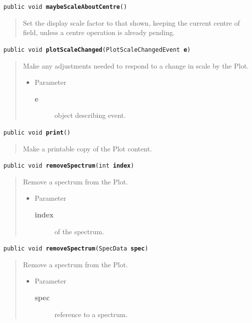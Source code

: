 \documentclass[twoside,11pt]{article}
\renewcommand{\_}{\texttt{\symbol{95}}}
\newcommand{\method}[1]{\texttt{#1}}
\newenvironment{desc}{\begin{quote}}{\end{quote}}
\begin{document}
\method{public void \textbf{maybeScaleAboutCentre}()\label{l186}\label{l187}}
\begin{desc}Set the display scale factor to that shown, keeping the current
 centre of field, unless a centre operation is already pending.
\end{desc}

\method{public void \textbf{plotScaleChanged}(\texttt{PlotScaleChangedEvent} \textbf{e})\label{l188}\label{l189}}
\begin{desc}Make any adjustments needed to respond to a change in scale by
 the Plot.
\begin{itemize}
\item{Parameter
  \begin{description}
   \item[\textbf{e}]{object describing event.}
  \end{description}}
\end{itemize}
\end{desc}

\method{public void \textbf{print}()\label{l190}\label{l191}}
\begin{desc}Make a printable copy of the Plot content.
\end{desc}

\method{public void \textbf{removeSpectrum}(\texttt{int} \textbf{index})\label{l192}\label{l193}}
\begin{desc}Remove a spectrum from the Plot.
\begin{itemize}
\item{Parameter
  \begin{description}
   \item[\textbf{index}]{of the spectrum.}
  \end{description}}
\end{itemize}
\end{desc}

\method{public void \textbf{removeSpectrum}(\texttt{SpecData} \textbf{spec})\label{l194}\label{l195}}
\begin{desc}Remove a spectrum from the Plot.
\begin{itemize}
\item{Parameter
  \begin{description}
   \item[\textbf{spec}]{reference to a spectrum.}
  \end{description}}
\end{itemize}
\end{desc}
\end{document}
